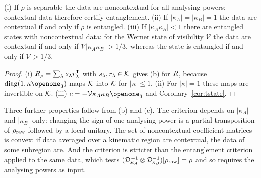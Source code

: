 \begin{corollary}
\label{cor:ent}
(i) If $\rho$ is separable the data are noncontextual for all analysing powers; contextual data therefore certify entanglement. (ii) If $|\kappa_A|=|\kappa_B|=1$ the data are contextual if and only if $\rho$ is entangled. (iii) If $|\kappa_A\kappa_B|<1$ there are entangled states with noncontextual data: for the Werner state of visibility $\mathcal{V}$ the data are contextual if and only if $\mathcal{V}|\kappa_A\kappa_B|>1/3$, whereas the state is entangled if and only if $\mathcal{V}>1/3$.
\end{corollary}

\begin{proof}
(i) $R_\rho=\sum_\lambda s_\lambda r_\lambda^{\mathsf{T}}$ with $s_\lambda,r_\lambda\in\mathcal{K}$ gives (b) for $R$, because $\operatorname{diag}(1,\kappa\openone_3)$ maps $\mathcal{K}$ into $\mathcal{K}$ for $|\kappa|\le1$. (ii) For $|\kappa|=1$ these maps are invertible on $\mathcal{K}$. (iii) $c=-\mathcal{V}\kappa_A\kappa_B\openone_3$ and Corollary~\ref{cor:tstate}.
\end{proof}

Three further properties follow from (b) and (c). The criterion depends on $|\kappa_A|$ and $|\kappa_B|$ only: changing the sign of one analysing power is a partial transposition of $\rho_{\mathrm{raw}}$ followed by a local unitary. The set of noncontextual coefficient matrices is convex: if data averaged over a kinematic region are contextual, the data of some subregion are. And the criterion is stricter than the entanglement criterion applied to the same data, which tests $(\mathcal{D}_{\kappa_A}^{-1}\otimes\mathcal{D}_{\kappa_B}^{-1})[\rho_{\mathrm{raw}}]=\rho$ and so requires the analysing powers as input.
